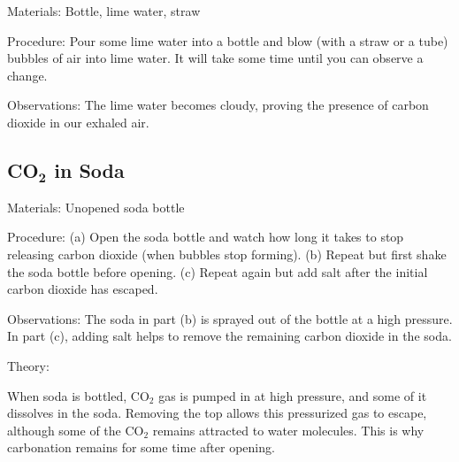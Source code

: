 \begin{multicols}{2}
\begin{description*}
\item[Materials:]{Bottle, lime water, straw}
\item[Procedure:]{Pour some lime water into a bottle and blow (with
a straw or a tube) bubbles of air into lime water. It will take
some time until you can observe a change.}
\item[Observations:]{The lime water becomes cloudy, proving the presence of carbon dioxide in our exhaled air.}
\end{description*}

\subsection{\textbf{CO}$_\textbf{2}$ in Soda} %


\begin{description*}
\item[Materials:]{Unopened soda bottle}
\item[Procedure:]{(a) Open the soda bottle and watch how long it takes to stop releasing carbon dioxide (when bubbles stop forming). (b) Repeat but first shake the soda bottle before opening. (c) Repeat again but add salt after the initial carbon dioxide has escaped. }
\item[Observations:]{The soda in part (b) is sprayed out of the bottle at a high pressure. In part (c), adding salt helps to remove the remaining carbon dioxide in the soda.}
\item[Theory:]{When soda is bottled, CO$_2$ gas is pumped in at high pressure, and some of it dissolves in the soda. Removing the top allows this pressurized gas to escape, although some of the CO$_2$ remains attracted to water molecules. This is why carbonation remains for some time after opening. 

}
\end{description*}
\end{multicols}

